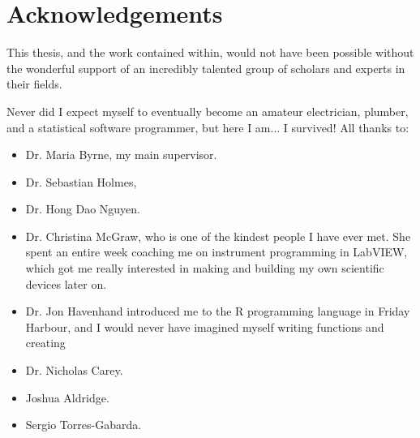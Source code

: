 \chapter*{Acknowledgements}

This thesis, and the work contained within, would not have been possible without the wonderful support of an incredibly talented group of scholars and experts in their fields. 

Never did I expect myself to eventually become an amateur electrician, plumber, and a statistical software programmer, but here I am... I survived! All thanks to:

\begin{itemize}
  \item Dr. Maria Byrne, my main supervisor.
  \item Dr. Sebastian Holmes,
  \item Dr. Hong Dao Nguyen.
  \item Dr. Christina McGraw, who is one of the kindest people I have ever met. She spent an entire week coaching me on instrument programming in LabVIEW, which got me really interested in making and building my own scientific devices later on.
  \item Dr. Jon Havenhand introduced me to the R programming language in Friday Harbour, and I would never have imagined myself writing functions and creating 
  \item Dr. Nicholas Carey.
  \item Joshua Aldridge.
  \item Sergio Torres-Gabarda.
\end{itemize}


\cleardoublepage
